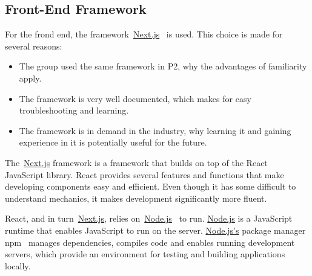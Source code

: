 \subsection{Front-End Framework}\label{subsec:front-end-framework}

For the frond end, the framework~\url{Next.js}~\cite{next2024} is used.
This choice is made for several reasons:

\begin{itemize}
    \item The group used the same framework in P2, why the advantages of familiarity apply.

    \item The framework is very well documented, which makes for easy troubleshooting and learning.

    \item The framework is in demand in the industry, why learning it and gaining experience in it is potentially useful
    for the future.
\end{itemize}

The~\url{Next.js} framework is a framework that builds on top of the React~\cite{react2024} JavaScript library.
React provides several features and functions that make developing components easy and efficient.
Even though it has some difficult to understand mechanics, it makes development significantly more fluent.

React, and in turn~\url{Next.js}, relies on~\url{Node.js}~\cite{node2024} to run.
\url{Node.js} is a JavaScript runtime that enables JavaScript to run on the server.
\url{Node.js's} package manager npm~\cite{npm2024} manages dependencies, compiles code and enables running
development servers, which provide an environment for testing and building applications locally.

